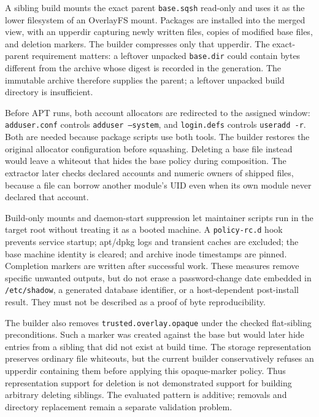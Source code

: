 A sibling build mounts the exact parent \texttt{base.sqsh} read-only and uses it as the lower filesystem of an OverlayFS mount. Packages are installed into the merged view, with an upperdir capturing newly written files, copies of modified base files, and deletion markers. The builder compresses only that upperdir. The exact-parent requirement matters: a leftover unpacked \texttt{base.dir} could contain bytes different from the archive whose digest is recorded in the generation. The immutable archive therefore supplies the parent; a leftover unpacked build directory is insufficient.

Before \ac{APT} runs, both account allocators are redirected to the assigned window: \texttt{adduser.conf} controls \texttt{adduser --system}, and \texttt{login.defs} controls \texttt{useradd -r}. Both are needed because package scripts use both tools. The builder restores the original allocator configuration before squashing. Deleting a base file instead would leave a whiteout that hides the base policy during composition. The extractor later checks declared accounts and numeric owners of shipped files, because a file can borrow another module's \ac{UID} even when its own module never declared that account.

Build-only mounts and daemon-start suppression let maintainer scripts run in the target root without treating it as a booted machine. A \texttt{policy-rc.d} hook prevents service startup; apt/dpkg logs and transient caches are excluded; the base machine identity is cleared; and archive inode timestamps are pinned. Completion markers are written after successful work. These measures remove specific unwanted outputs, but do not erase a password-change date embedded in \texttt{/etc/shadow}, a generated database identifier, or a host-dependent post-install result. They must not be described as a proof of byte reproducibility.

The builder also removes \texttt{trusted.overlay.opaque} under the checked flat-sibling preconditions. Such a marker was created against the base but would later hide entries from a sibling that did not exist at build time. The storage representation preserves ordinary file whiteouts, but the current builder conservatively refuses an upperdir containing them before applying this opaque-marker policy. Thus representation support for deletion is not demonstrated support for building arbitrary deleting siblings. The evaluated pattern is additive; removals and directory replacement remain a separate validation problem.

